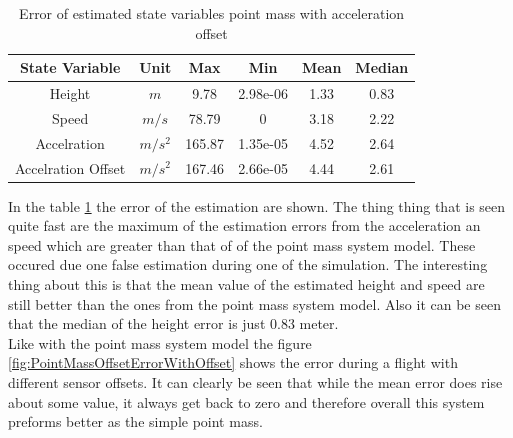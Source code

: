 \begin{table}[h!]
\centering
\begin{tabular}{cccccc}
\hline
\multicolumn{1}{|c|}{State Variable} & \multicolumn{1}{c|}{Unit} & \multicolumn{1}{c|}{Max} & \multicolumn{1}{c|}{Min} & \multicolumn{1}{c|}{Mean} & \multicolumn{1}{c|}{Median} \\ \hline
Height                            & $m$                         & 9.78                   & 2.98e-06                 & 1.33                    & 0.83                      \\
Speed                             & $m/s$                       & 78.79                  & 0                        & 3.18                    & 2.22                      \\
Accelration                       & $m/s^2$   			& 165.87                  & 1.35e-05                 & 4.52                    & 2.64                     \\
Accelration Offset                & $m/s^2$   			& 167.46                  & 2.66e-05                 & 4.44                    & 2.61                     
\end{tabular}
\caption{Error of estimated state variables point mass with acceleration offset}
\label{tab:ErrorPointMassAccelerationOffset}
\end{table}

In the table \ref{tab:ErrorPointMassAccelerationOffset} the error of the estimation are shown.
The thing thing that is seen quite fast are the maximum of the estimation errors from the acceleration an speed which are greater than that of of the point mass system model.
These occured due one false estimation during one of the simulation.
The interesting thing about this is that the mean value of the estimated height and speed are still better than the ones from the point mass system model.
Also it can be seen that the median of the height error is just 0.83 meter. \\

Like with the point mass system model the figure \ref{fig:PointMassOffsetErrorWithOffset} shows the error during a flight with different sensor offsets.
It can clearly be seen that while the mean error does rise about some value, it always get back to zero and therefore overall this system preforms better as the simple point mass.

